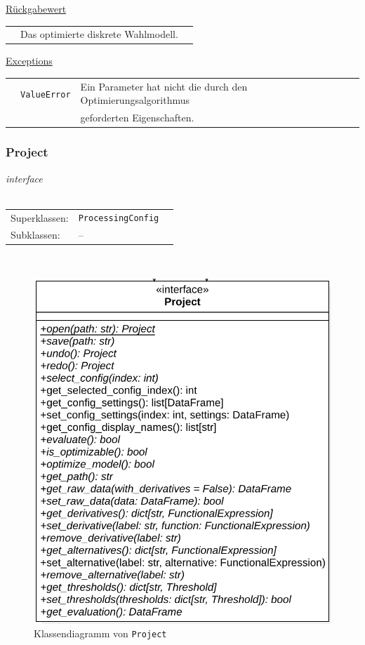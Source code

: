 \documentclass{article}
\begin{document}
\begin{itemize}
\begin{itemize}
\underline{Rückgabewert}\\
\begin{tabular}{lll}
 & Das optimierte diskrete Wahlmodell.\\
\end{tabular}

\underline{Exceptions}\\
\begin{tabular}{lll}
 & \texttt{ValueError} & Ein Parameter hat nicht die durch den Optimierungsalgorithmus\\
 && geforderten Eigenschaften.\\
\end{tabular}
\end{itemize}


\newpage
\subsubsection*{\large{\textbf{Project}\label{cls:Project}}}
\textit{\flqq{}interface\frqq}\normalsize\\\\
\begin{tabular}{lll}
 Superklassen: & \texttt{ProcessingConfig}\\
 Subklassen: & --
\end{tabular}\\
\begin{figure}[H]%
    \centering
    \includegraphics[width=13cm]{entwurf/Entwurf_dokument/img/cls/model/Project.png}
    \caption{Klassendiagramm von \texttt{Project}}
\end{figure}


\end{itemize}
\end{document}
